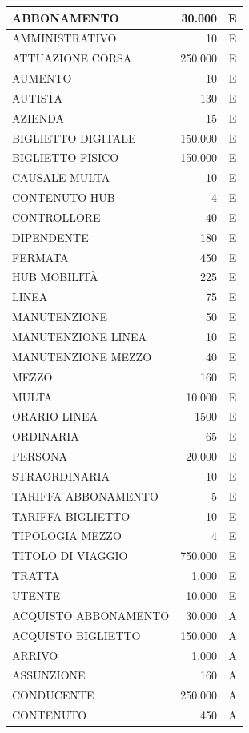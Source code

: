 \documentclass[12pt,a4paper]{report}
\begin{document}
\begin{longtable}{|p{7.5cm}|r|c|}
ABBONAMENTO & 30.000 & E \\
\hline
AMMINISTRATIVO & 10 & E \\
\hline
ATTUAZIONE CORSA & 250.000 & E \\
\hline
AUMENTO & 10 & E \\
\hline
AUTISTA & 130 & E \\
\hline
AZIENDA & 15 & E\\
\hline
BIGLIETTO DIGITALE & 150.000 & E \\
\hline
BIGLIETTO FISICO & 150.000 & E \\
\hline
CAUSALE MULTA & 10 & E \\
\hline
CONTENUTO HUB & 4 & E \\
\hline
CONTROLLORE & 40 & E \\
\hline
DIPENDENTE & 180 & E \\
\hline
FERMATA & 450 & E \\
\hline
HUB MOBILITÀ & 225 & E \\
\hline
LINEA & 75 & E \\
\hline
MANUTENZIONE & 50 & E \\
\hline
MANUTENZIONE LINEA & 10 & E \\
\hline
MANUTENZIONE MEZZO & 40 & E \\
\hline
MEZZO & 160 & E \\
\hline
MULTA & 10.000 & E \\
\hline
ORARIO LINEA & 1500 & E \\
\hline
ORDINARIA & 65 & E \\
\hline
PERSONA & 20.000 & E \\
\hline
STRAORDINARIA & 10 & E \\
\hline
TARIFFA ABBONAMENTO & 5 & E \\
\hline
TARIFFA BIGLIETTO & 10 & E \\
\hline
TIPOLOGIA MEZZO & 4 & E \\
\hline
TITOLO DI VIAGGIO & 750.000 & E \\
\hline
TRATTA & 1.000 & E \\
\hline
UTENTE & 10.000 & E \\
\hline
ACQUISTO ABBONAMENTO & 30.000 & A \\
\hline
ACQUISTO BIGLIETTO & 150.000 & A \\
\hline
ARRIVO & 1.000 & A \\
\hline
ASSUNZIONE & 160 & A \\
\hline
CONDUCENTE & 250.000 & A \\
\hline
CONTENUTO & 450 & A \\

\end{longtable}
\end{document}
